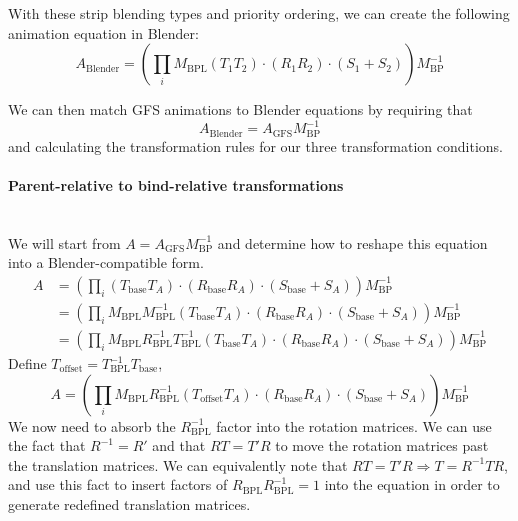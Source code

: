 \documentclass{article}
\begin{document}
With these strip blending types and priority ordering, we can create the following animation equation in Blender:
\begin{equation}
A_\mathrm{Blender} = \left( \prod_i {M}_\mathrm{BPL} \left(T_1 T_2\right) \cdot \left(R_1 R_2\right) \cdot \left(S_1 + S_2\right) \right) M_\mathrm{BP}^{-1}
\end{equation}

We can then match GFS animations to Blender equations by requiring that
\begin{equation}
A_\mathrm{Blender} = A_\mathrm{GFS} M^{-1}_\mathrm{BP}
\end{equation}
and calculating the transformation rules for our three transformation conditions.

\paragraph{Parent-relative to bind-relative transformations}\mbox{}\\
We will start from $A = A_\mathrm{GFS} M^{-1}_\mathrm{BP}$ and determine how to reshape this equation into a Blender-compatible form.
\begin{align}
A &= \left( \prod_i \left(T_\mathrm{base} T_A\right) \cdot \left(R_\mathrm{base} R_A\right) \cdot \left(S_\mathrm{base} + S_A\right) \right) M_\mathrm{BP}^{-1}\\
 &= \left( \prod_i M_\mathrm{BPL} M_\mathrm{BPL}^{-1} \left(T_\mathrm{base} T_A\right) \cdot \left(R_\mathrm{base} R_A\right) \cdot \left(S_\mathrm{base} + S_A\right) \right) M_\mathrm{BP}^{-1}\\
  &= \left( \prod_i M_\mathrm{BPL} R_\mathrm{BPL}^{-1} T_\mathrm{BPL}^{-1} \left(T_\mathrm{base} T_A\right) \cdot \left(R_\mathrm{base} R_A\right) \cdot \left(S_\mathrm{base} + S_A\right) \right) M_\mathrm{BP}^{-1}
\end{align}
Define $T_\mathrm{offset} = T^{-1}_\mathrm{BPL} T_\mathrm{base}$,
\begin{equation}
A  = \left( \prod_i M_\mathrm{BPL} R_\mathrm{BPL}^{-1} \left(T_\mathrm{offset} T_A\right) \cdot \left(R_\mathrm{base} R_A\right) \cdot \left(S_\mathrm{base} + S_A\right) \right) M_\mathrm{BP}^{-1}
\end{equation}
We now need to absorb the $R^{-1}_\mathrm{BPL}$ factor into the rotation matrices. We can use the fact that $R^{-1} = R'$ and that $RT = T'R$ to move the rotation matrices past the translation matrices. We can equivalently note that $RT = T'R \Rightarrow T = R^{-1}TR$, and use this fact to insert factors of $R_\mathrm{BPL}R^{-1}_\mathrm{BPL} = 1$ into the equation in order to generate redefined translation matrices. 
\end{document}

